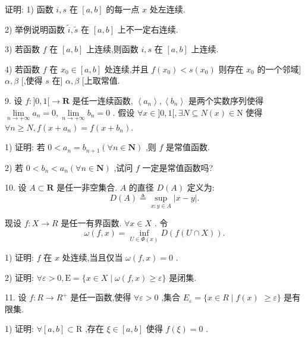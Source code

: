 证明: 1) 函数 $i,s$ 在 $\left\lbrack  {a,b}\right\rbrack$ 的每一点 $x$ 处左连续.

2) 举例说明函数 $\widetilde{i},\widetilde{s}$ 在 $\left\lbrack  {a,b}\right\rbrack$ 上不一定右连续.

3) 若函数 $f$ 在 $\left\lbrack  {a,b}\right\rbrack$ 上连续,则函数 $i,s$ 在 $\left\lbrack  {a,b}\right\rbrack$ 上连续.

4) 若函数 $f$ 在 ${x}_{0} \in  \left\lbrack  {a,b}\right\rbrack$ 处连续,并且 $f\left( {x}_{0}\right)  < s\left( {x}_{0}\right)$ 则存在 ${x}_{0}$ 的一个邻域] $\alpha ,\beta$ [,使得 $s$ 在] $\alpha ,\beta$ [上取常值.

9. 设 $f : \rbrack 0,1\lbrack  \rightarrow  \mathbf{R}$ 是任一连续函数, $\left\langle  {a}_{n}\right\rangle  ,\left\langle  {b}_{n}\right\rangle$ 是两个实数序列使得 $\mathop{\lim }\limits_{{n \rightarrow   + \infty }}{a}_{n} = 0,\mathop{\lim }\limits_{{n \rightarrow   + \infty }}{b}_{n} = 0$ . 假设 $\forall x \in  \rbrack 0,1\lbrack ,\exists N \subseteq  N\left( x\right)  \in  \mathrm{N}$ 使得 $\forall n \geq  N,f\left( {x + {a}_{n}}\right)  = f\left( {x + {b}_{n}}\right) .$

1) 证明: 若 $0 < {a}_{n} = {b}_{n + 1}\left( {\forall n \in  \mathbf{N}}\right)$ ,则 $f$ 是常值函数.

2) 若 $0 < {b}_{n} < {a}_{n}\left( {\forall n \in  \mathbf{N}}\right)$ ,试问 $f$ 一定是常值函数吗?

10. 设 $A \subset  \mathbf{R}$ 是任一非空集合. $A$ 的直径 $D\left( A\right)$ 定义为:
$$D\left( A\right)  \triangleq  \mathop{\sup }\limits_{{x : y \in  A}}\left| {x - y}\right| .$$

现设 $f : X \rightarrow  R$ 是任一有界函数. $\forall x \in  X$ . 令
$$\omega \left( {f,x}\right)  = \mathop{\inf }\limits_{{U \in  \Phi \left( x\right) }}D\left( {f\left( {U \cap  X}\right) }\right) .$$

1) 证明: $f$ 在 $x$ 处连续,当且仅当 $\omega \left( {f,x}\right)  = 0$ .

2) 证明: $\forall \varepsilon  > 0,\mathrm{E} = \{ x \in  X \mid  \omega \left( {f,x}\right)  \geq  \varepsilon \}$ 是闭集.

11. 设 $f : R \rightarrow  {R}^{ + }$ 是任一函数,使得 $\forall \varepsilon  > 0$ ,集合 ${E}_{\varepsilon } = \{ x \in  R \mid  f\left( x\right)$  $\geq  \varepsilon \}$ 是有限集.

1) 证明: $\forall \left\lbrack  {a,b}\right\rbrack   \subset  \mathrm{R}$ ,存在 $\xi  \in  \left\lbrack  {a,b}\right\rbrack$ 使得 $f\left( \xi \right)  = 0$ .

